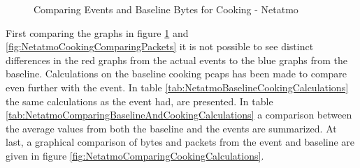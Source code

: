 \begin{figure}[H]
\begin{subfigure}[b]{0.47\textwidth}
        \centering
    \end{subfigure}
        \begin{subfigure}[b]{0.47\textwidth}
        \centering
    \end{subfigure}
    \begin{subfigure}[b]{0.47\textwidth}
        \centering
    \end{subfigure}
    \begin{subfigure}[b]{0.47\textwidth}
        \centering
    \end{subfigure}
    \hspace{0.6cm}
    \begin{subfigure}[b]{0.47\textwidth}
    \centering
        \end{subfigure}
    \caption{Comparing Events and Baseline Bytes for Cooking - Netatmo}
    \label{fig:NetatmoCookingComparingBytes}
\end{figure}

First comparing the graphs in figure \ref{fig:NetatmoCookingComparingBytes} and \ref{fig:NetatmoCookingComparingPackets} it is not possible to see distinct differences in the red graphs from the actual events to the blue graphs from the baseline. Calculations on the baseline cooking pcaps has been made to compare even further with the event. In table \ref{tab:NetatmoBaselineCookingCalculations} the same calculations as the event had, are presented. In table \ref{tab:NetatmoComparingBaselineAndCookingCalculations} a comparison between the average values from both the baseline and the events are summarized. At last, a graphical comparison of bytes and packets from the event and baseline are given in figure \ref{fig:NetatmoComparingCookingCalculations}. 

